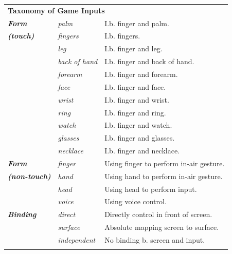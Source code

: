 \documentclass{sigchi}
\newcommand\tabhead[1]{\small\textbf{#1}}
\begin{document}
    \begin{table}
    \centering
    \begin{adjustwidth}{-0.5cm}{}
    \begin{tabular}{|l|l|l|}
      \hline
      \multicolumn{3}{|p{1.06\columnwidth}|}{\centering\tabhead{\textbf{Taxonomy of Game Inputs}}}\\
      \Xhline{4\arrayrulewidth}
        \textbf{\em{Form}} & \em{palm} & I.b. finger and palm. \\ \cline{2-3} 
        \textbf{\em{{\fontsize{0.3cm}{1em}\selectfont (touch)}}} & \em{fingers} & I.b. fingers.\\ \cline{2-3} 
             & \em{leg} & I.b. finger and leg.\\ \cline{2-3} 
             & \em{back of hand} & I.b. finger and back of hand.\\ \cline{2-3} 
             & \em{forearm} & I.b. finger and forearm.\\ \cline{2-3} 
             & \em{face} & I.b. finger and face.\\ \cline{2-3} 
             & \em{wrist} & I.b. finger and wrist.\\ \cline{2-3} 
             & \em{ring} & I.b. finger and ring. \\ \cline{2-3} 
             & \em{watch} & I.b. finger and watch.\\ \cline{2-3} 
             & \em{glasses} & I.b. finger and glasses.\\ \cline{2-3} 
             & \em{necklace} & I.b. finger and necklace.\\ 
       \Xhline{4\arrayrulewidth}
        \textbf{\em{Form}} & \em{finger} & Using finger to perform in-air gesture.\\ \cline{2-3} 
        \textbf{\em{{\fontsize{0.3cm}{1em}\selectfont (non-touch)}}}  & \em{hand} & Using hand to perform in-air gesture.\\ \cline{2-3} 
             & \em{head} & Using head to perform input.\\ \cline{2-3} 
             & \em{voice} & Using voice control.\\ 
      \Xhline{4\arrayrulewidth}
        \textbf{\em{Binding}} & \em{direct} & Directly control in front of screen. \\ \cline{2-3} 
             & \em{surface} & Absolute mapping screen to surface.\\ \cline{2-3} 
             & \em{independent} & No binding b. screen and input.\\
      \Xhline{4\arrayrulewidth}

\end{tabular}
\end{adjustwidth}
\end{table}
\end{document}
